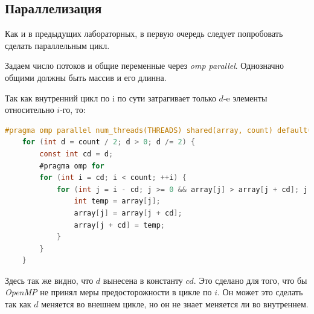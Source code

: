 \subsection{Параллелизация}

Как и в предыдущих лабораторных, в первую очередь следует попробовать сделать параллельным цикл.

Задаем число потоков и общие переменные через \textit{omp parallel}.
Однозначно общими должны быть массив и его длинна.

Так как внутренний цикл по i по сути затрагивает только $d$-e элементы относительно $i$-го, то:

\begin{lstlisting}[language=C, basicstyle=\scriptsize]
 #pragma omp parallel num_threads(THREADS) shared(array, count) default(none)
    for (int d = count / 2; d > 0; d /= 2) {
        const int cd = d;
        #pragma omp for
        for (int i = cd; i < count; ++i) {
            for (int j = i - cd; j >= 0 && array[j] > array[j + cd]; j -= cd) {
                int temp = array[j];
                array[j] = array[j + cd];
                array[j + cd] = temp;
            }
        }
    }
\end{lstlisting}

Здесь так же видно, что $d$ вынесена в константу $cd$.
Это сделано для того, что бы \textit{OpenMP} не принял меры предосторожности в цикле по $i$.
Он может это сделать так как $d$ меняется во внешнем цикле, но он не знает меняется ли во внутреннем.
